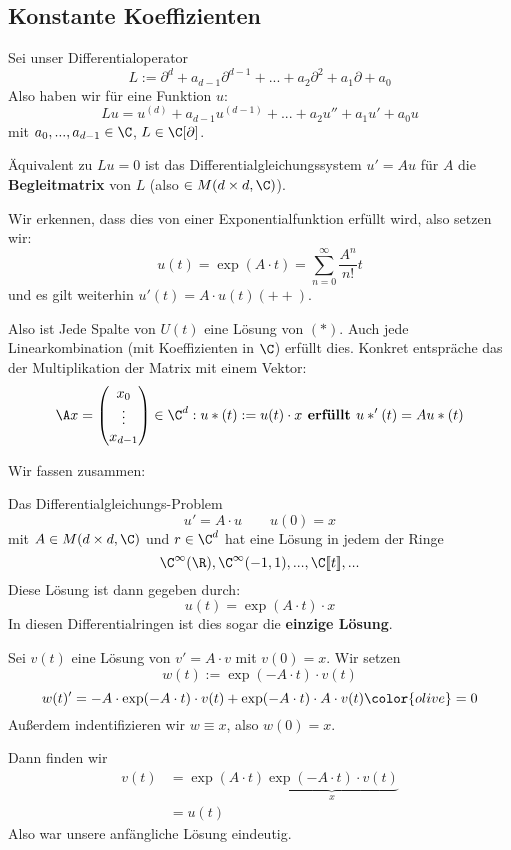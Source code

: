\documentclass[main.tex]{subfiles}
\begin{document}
\subsection{Konstante Koeffizienten}

Sei unser Differentialoperator
$$L:= \partial^d + a_{d-1} \partial^{d-1} + ... + a_2 \partial^2 + a_1 \partial + a_0$$
Also haben wir für eine Funktion $u$:
$$Lu = u^{(d)} + a_{d-1} u^{(d-1)} + ... + a_2 u'' + a_1 u' + a_0 u$$
mit $a_0, ..., a_{d-1} \in \C$, $L \in \C[\partial]$.

Äquivalent zu $Lu = 0$ ist das Differentialgleichungssystem $u' = Au$ für $A$ die \textbf{Begleitmatrix} von $L$ (also $\in M(d \times d, \C)$).

Wir erkennen, dass dies von einer Exponentialfunktion erfüllt wird, also setzen wir:
$$u(t) = \exp(A \cdot t) = \sum \limits_{n=0}^\infty \dfrac{A^n}{n!}t$$
und es gilt weiterhin $u'(t) = A \cdot u(t) (++)$.

Also ist Jede Spalte von $U(t)$ eine Lösung von $(*)$. Auch jede Linearkombination (mit Koeffizienten in $\C$) erfüllt dies. Konkret entspräche das der Multiplikation der Matrix mit einem Vektor:
$$\A x = \begin{pmatrix}
  x_0 \\ \vdots \\ x_{d-1}
\end{pmatrix}\in \C^d : u*(t) := u(t) \cdot x \textbf{ erfüllt } u*'(t) = A u*(t)$$

Wir fassen zusammen:
\begin{Theorem}
  Das Differentialgleichungs-Problem
  $$u' = A \cdot u \qquad u(0) = x$$
  mit $A \in M(d \times d, \C)$ und $r \in \C^d$ hat eine Lösung in jedem der Ringe
  $$\C^\infty(\R), \C^\infty(-1,1),...,\C[\![t]\!], ...$$
  Diese Lösung ist dann gegeben durch:
  $$u(t) = \exp(A \cdot t) \cdot x$$
  In diesen Differentialringen ist dies sogar die \textbf{einzige Lösung}.
\end{Theorem}

\begin{Beweis}
  Sei $v(t)$ eine Lösung von $v' = A \cdot v$ mit $v(0) = x$. Wir setzen
  $$w(t) := \exp(-A \cdot t) \cdot v(t)$$
  $$w(t)' = -A \cdot \exp(-A \cdot t) \cdot v(t) + \exp(-A \cdot t) \cdot A \cdot v(t) {\color{olive} = 0}$$
  Außerdem indentifizieren wir $w \equiv x$, also $w(0) = x$.

  Dann finden wir
  $$\begin{aligned}
    v(t) & = \exp(A \cdot t) \underbrace{\exp(-A \cdot t) \cdot v(t)}_{x} \\
    & = u(t)
  \end{aligned}$$
  Also war unsere anfängliche Lösung eindeutig.
\end{Beweis}
\end{document}
